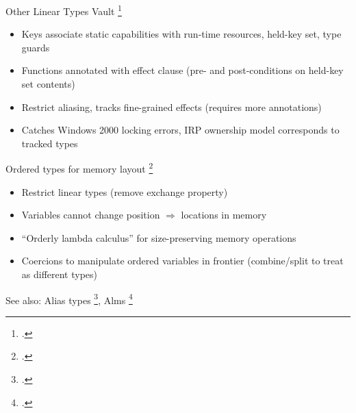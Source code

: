 \documentclass[aspectratio=169]{beamer}
\begin{document}
\begin{frame}{Other Linear Types}
\footnotesize
  Vault \footcite{deline_enforcing_2001} %
    \vspace{-0.09in}
    \begin{itemize}
        \item Keys associate static capabilities with run-time resources, held-key set, type guards
        \item Functions annotated with effect clause (pre- and post-conditions on held-key set contents)
        \item Restrict aliasing, tracks fine-grained effects (requires more annotations)
        \item Catches Windows 2000 locking errors, IRP ownership model corresponds to tracked types
    \end{itemize}
  Ordered types for memory layout \footcite{petersen_type_2003}
    \vspace{-0.09in}
    \begin{itemize}
        \item Restrict linear types (remove exchange property)
        \item Variables cannot change position $\Rightarrow$ locations in memory
        \item ``Orderly lambda calculus'' for size-preserving memory operations
        \item Coercions to manipulate ordered variables in frontier (combine/split to treat as different types)
    \end{itemize}
  See also: Alias types \footcite{smith_alias_2000}, Alms \footcite{tov_practical_2011}
  \vspace{0.1in}
\end{frame}
\end{document}
